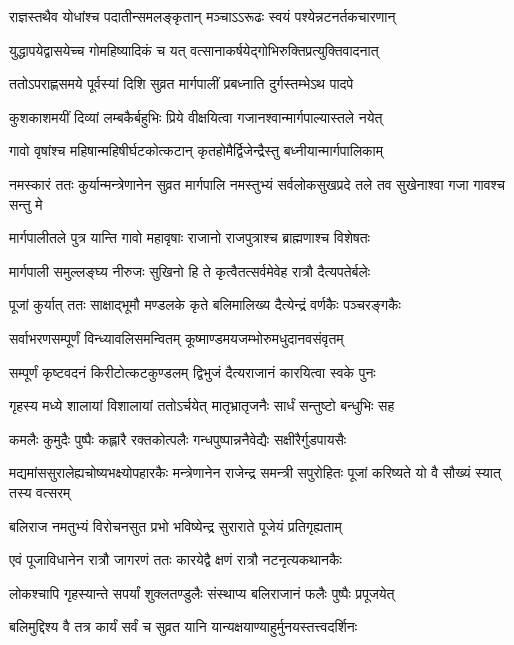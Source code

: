 \twolineshloka
{राज्ञस्तथैव योधांश्च पदातीन्समलङ्कृतान्}
{मञ्चाऽऽरूढः स्वयं पश्येन्नटनर्तकचारणान्} %

\twolineshloka
{युद्धापयेद्वासयेच्च गोमहिष्यादिकं च यत्}
{वत्सानाकर्षयेद्गोभिरुक्तिप्रत्युक्तिवादनात्} %

\twolineshloka
{ततोऽपराह्णसमये पूर्वस्यां दिशि सुव्रत}
{मार्गपालीं प्रबध्नाति दुर्गस्तम्भेऽथ पादपे} %

\twolineshloka
{कुशकाशमयीं दिव्यां लम्बकैर्बहुभिः प्रिये}
{वीक्षयित्वा गजानश्वान्मार्गपाल्यास्तले नयेत्} %

\twolineshloka
{गावो वृषांश्च महिषान्महिषीर्घटकोत्कटान्}
{कृतहोमैर्द्विजेन्द्रैस्तु बध्नीयान्मार्गपालिकाम्} %

\threelineshloka
{नमस्कारं ततः कुर्यान्मन्त्रेणानेन सुव्रत}
{मार्गपालि नमस्तुभ्यं सर्वलोकसुखप्रदे}
{तले तव सुखेनाश्वा गजा गावश्च सन्तु मे} %

\twolineshloka
{मार्गपालीतले पुत्र यान्ति गावो महावृषाः}
{राजानो राजपुत्राश्च ब्राह्मणाश्च विशेषतः} %

\twolineshloka
{मार्गपाली समुल्लङ्घ्य नीरुजः सुखिनो हि ते}
{कृत्वैतत्सर्वमेवेह रात्रौ दैत्यपतेर्बलेः} %

\twolineshloka
{पूजां कुर्यात् ततः साक्षाद्भूमौ मण्डलके कृते}
{बलिमालिख्य दैत्येन्द्रं वर्णकैः पञ्चरङ्गकैः} %

\twolineshloka
{सर्वाभरणसम्पूर्णं विन्ध्यावलिसमन्वितम्}
{कूष्माण्डमयजम्भोरुमधुदानवसंवृतम्} %

\twolineshloka
{सम्पूर्णं कृष्टवदनं किरीटोत्कटकुण्डलम्}
{द्विभुजं दैत्यराजानं कारयित्वा स्वके पुनः} %

\twolineshloka
{गृहस्य मध्ये शालायां विशालायां ततोऽर्चयेत्}
{मातृभ्रातृजनैः सार्धं सन्तुष्टो बन्धुभिः सह} %

\twolineshloka
{कमलैः कुमुदैः पुष्पैः कह्लारै रक्तकोत्पलैः}
{गन्धपुष्पान्ननैवेद्यैः सक्षीरैर्गुडपायसैः} %

\threelineshloka
{मद्यमांससुरालेह्यचोष्यभक्ष्योपहारकैः}
{मन्त्रेणानेन राजेन्द्र समन्त्री सपुरोहितः}
{पूजां करिष्यते यो वै सौख्यं स्यात् तस्य वत्सरम्} %

\twolineshloka
{बलिराज नमतुभ्यं विरोचनसुत प्रभो}
{भविष्येन्द्र सुराराते पूजेयं प्रतिगृह्यताम्} %

\twolineshloka
{एवं पूजाविधानेन रात्रौ जागरणं ततः}
{कारयेद्वै क्षणं रात्रौ नटनृत्यकथानकैः} %

\twolineshloka
{लोकश्चापि गृहस्यान्ते सपर्यां शुक्लतण्डुलैः}
{संस्थाप्य बलिराजानं फलैः पुष्पैः प्रपूजयेत्} %

\twolineshloka
{बलिमुद्दिश्य वै तत्र कार्यं सर्वं च सुव्रत}
{यानि यान्यक्षयाण्याहुर्मुनयस्तत्त्वदर्शिनः} %

